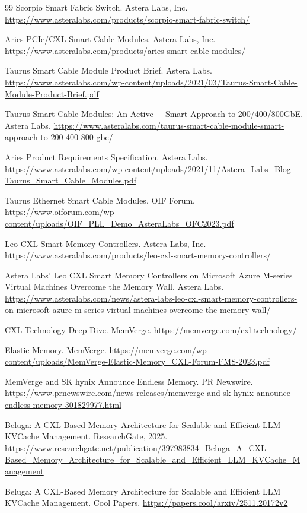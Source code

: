 \begin{thebibliography}{99}
 Scorpio Smart Fabric Switch. Astera Labs, Inc. \url{https://www.asteralabs.com/products/scorpio-smart-fabric-switch/}

 Aries PCIe/CXL Smart Cable Modules. Astera Labs, Inc. \url{https://www.asteralabs.com/products/aries-smart-cable-modules/}

 Taurus Smart Cable Module Product Brief. Astera Labs. \url{https://www.asteralabs.com/wp-content/uploads/2021/03/Taurus-Smart-Cable-Module-Product-Brief.pdf}

 Taurus Smart Cable Modules: An Active + Smart Approach to 200/400/800GbE. Astera Labs. \url{https://www.asteralabs.com/taurus-smart-cable-module-smart-approach-to-200-400-800-gbe/}

 Aries Product Requirements Specification. Astera Labs. \url{https://www.asteralabs.com/wp-content/uploads/2021/11/Astera_Labs_Blog-Taurus_Smart_Cable_Modules.pdf}

 Taurus Ethernet Smart Cable Modules. OIF Forum. \url{https://www.oiforum.com/wp-content/uploads/OIF_PLL_Demo_AsteraLabs_OFC2023.pdf}

 Leo CXL Smart Memory Controllers. Astera Labs, Inc. \url{https://www.asteralabs.com/products/leo-cxl-smart-memory-controllers/}

 Astera Labs' Leo CXL Smart Memory Controllers on Microsoft Azure M-series Virtual Machines Overcome the Memory Wall. Astera Labs. \url{https://www.asteralabs.com/news/astera-labs-leo-cxl-smart-memory-controllers-on-microsoft-azure-m-series-virtual-machines-overcome-the-memory-wall/}

 CXL Technology Deep Dive. MemVerge. \url{https://memverge.com/cxl-technology/}

 Elastic Memory. MemVerge. \url{https://memverge.com/wp-content/uploads/MemVerge-Elastic-Memory_CXL-Forum-FMS-2023.pdf}

 MemVerge and SK hynix Announce Endless Memory. PR Newswire. \url{https://www.prnewswire.com/news-releases/memverge-and-sk-hynix-announce-endless-memory-301829977.html}

 Beluga: A CXL-Based Memory Architecture for Scalable and Efficient LLM KVCache Management. ResearchGate, 2025. \url{https://www.researchgate.net/publication/397983834_Beluga_A_CXL-Based_Memory_Architecture_for_Scalable_and_Efficient_LLM_KVCache_Management}

 Beluga: A CXL-Based Memory Architecture for Scalable and Efficient LLM KVCache Management. Cool Papers. \url{https://papers.cool/arxiv/2511.20172v2}


\end{thebibliography}
